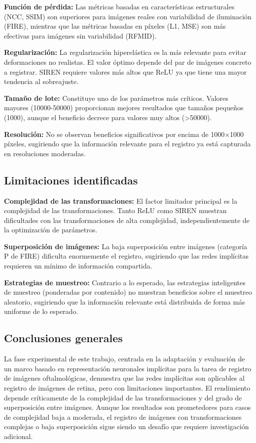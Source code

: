\textbf{Función de pérdida:} Las métricas basadas en características estructurales (NCC, SSIM) son superiores para imágenes reales con variabilidad de iluminación (FIRE), mientras que las métricas basadas en píxeles (L1, MSE) son más efectivas para imágenes sin variabilidad (RFMID).

\textbf{Regularización:} La regularización hiperelástica es la más relevante para evitar deformaciones no realistas. El valor óptimo depende del par de imágenes concreto a registrar. SIREN requiere valores más altos que ReLU ya que tiene una mayor tendencia al sobreajuste.

\textbf{Tamaño de lote:} Constituye uno de los parámetros más críticos. Valores mayores (10000-50000) proporcionan mejores resultados que tamaños pequeños (1000), aunque el beneficio decrece para valores muy altos (>50000).

\textbf{Resolución:} No se observan beneficios significativos por encima de 1000×1000 píxeles, sugiriendo que la información relevante para el registro ya está capturada en resoluciones moderadas.

\subsection{Limitaciones identificadas}
\label{subsec:Limitacións identificadas}

\textbf{Complejidad de las transformaciones:} El factor limitador principal es la complejidad de las transformaciones. Tanto ReLU como SIREN muestran dificultades con las transformaciones de alta complejidad, independientemente de la optimización de parámetros.

\textbf{Superposición de imágenes:} La baja superposición entre imágenes (categoría P de FIRE) dificulta enormemente el registro, sugiriendo que las redes implícitas requieren un mínimo de información compartida.

\textbf{Estrategias de muestreo:} Contrario a lo esperado, las estrategias inteligentes de muestreo (ponderadas por contenido) no muestran beneficios sobre el muestreo aleatorio, sugiriendo que la información relevante está distribuida de forma más uniforme de lo esperado.

\subsection{Conclusiones generales}
\label{subsec:Conclusións xerais}

La fase experimental de este trabajo, centrada en la adaptación y evaluación de un marco basado en representación neuronales implícitas para la tarea de registro de imágenes oftalmológicas, demuestra que las redes implícitas son aplicables al registro de imágenes de retina, pero con limitaciones importantes. El rendimiento depende críticamente de la complejidad de las transformaciones y del grado de superposición entre imágenes. Aunque los resultados son prometedores para casos de complejidad baja a moderada, el registro de imágenes con transformaciones complejas o baja superposición sigue siendo un desafío que requiere investigación adicional.

